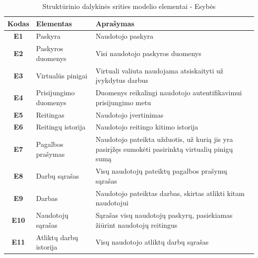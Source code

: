 \documentclass{VUMIFPSbakalaurinis}
\begin{document}
\begin{table}[H]\footnotesize
	\centering
	\caption{Struktūrinio dalykinės srities modelio elementai - Esybės}
	{
	\setlength{\arrayrulewidth}{0.25mm}
	{\begin{tabular}{|c|m{5.75cm}|m{5.75cm}|} \hline
		Kodas & Elementas & Aprašymas \\
		\hline
		\textbf{E1} & Paskyra & Naudotojo paskyra \\
		\textbf{E2} & Paskyros duomenys & Visi naudotojo paskyros duomenys \\
		\textbf{E3} & Virtualūs pinigai & Virtuali valiuta naudojama atsiskaityti už įvykdytus darbus \\
		\textbf{E4} & Prisijungimo duomenys & Duomenys reikalingi naudotojo autentifikavimui prisijungimo metu \\
		\textbf{E5} & Reitingas & Naudotojo įvertinimas \\
		\textbf{E6} & Reitingų istorija & Naudotojo reitingo kitimo istorija \\
		\textbf{E7} & Pagalbos prašymas & Naudotojo pateikta užduotis, už kurią jis yra pasirįžęs sumokėti pasirinktą virtualių pinigų sumą \\
		\textbf{E8} & Darbų sąrašas & Visų naudotojų pateiktų pagalbos prašymų sąrašas \\
		\textbf{E9} & Darbas & Naudotojo pateiktas darbas, skirtas atlikti kitam naudotojui \\
		\textbf{E10} & Naudotojų sąrašas & Sąrašas visų naudotojų paskyrų, pasiekiamas žiūrint naudotojų reitingus \\
		\textbf{E11} & Atliktų darbų istorija & Visų naudotojo atliktų darbų sąrašas \\
		\hline
	\end{tabular}}
	
	}
	\label{tab:entity table}
\end{table}
\end{document}
